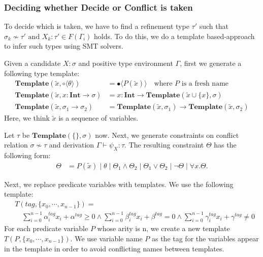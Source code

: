\documentclass[runningheads]{llncs}
\newcommand\COL{\mathbin{:}}
\newcommand \stypeint {\textbf{Int}}
\newcommand \stypebool {\bullet}
\newcommand \stypeboolf {\circ}
\newcommand \typeint[1]{{#1} : \stypeint}
\newcommand \typebool[1]{\stypebool \langle #1 \rangle}
\newcommand \typeboolf[1]{\stypeboolf \langle #1 \rangle}
\newcommand {\conflict}{\not \sim}
\begin{document}
\subsubsection{Deciding whether Decide or Conflict is taken}

To decide which is taken, we have to find a refinement type \( \tau' \) such that \( \sigma_k \conflict \tau' \text{ and } X_k \COL \tau' \in F(\Gamma_i) \) holds.
To do this, we do a template based-approach to infer such types using SMT solvers.


Given a candidate \( X \COL \sigma \) and positive type environment \( \Gamma \), first we generate a following type template:
\begin{align*}
    \textbf{Template}(\tilde{x}, \typeboolf{\theta})
        &= \typebool{P(\tilde{x})} \quad \text{where } P \text{ is a fresh name} \\
    \textbf{Template}(\tilde{x}, \typeint{x} \to \sigma)
        &= \typeint{x} \to \textbf{Template}(\tilde{x} \cup \{x\}, \sigma)\\
    \textbf{Template}(\tilde{x}, \sigma_1 \to \sigma_2)
        &= \textbf{Template}(\tilde{x}, \sigma_1)
        \to \textbf{Template}(\tilde{x}, \sigma_2)
\end{align*}
Here, we think \( \tilde{x} \) is a sequence of variables.

Let \( \tau \) be \( \textbf{Template}(\{\}, \sigma) \) now.
Next, we generate constraints on conflict relation \( \sigma \conflict \tau \)
and derivation \( \Gamma \vdash \psi_X \COL \tau \).
The resulting constraint \( \Theta \) has the following form:
\begin{align*}
    \Theta &= P(\tilde{x})
            \mid \theta
            \mid \Theta_1 \land \Theta_2
            \mid \Theta_1 \lor \Theta_2
            \mid \lnot \Theta
            \mid \forall x. \Theta.
\end{align*}

Next, we replace predicate variables with templates.
We use the following template:
\begin{align*}
    &T(tag, \{x_0, \cdots, x_{n-1}\}) = \\
       &\quad \sum_{i=0}^{n-1} \alpha^{tag}_i x_i + \alpha^{tag} \geq 0
        \land \sum_{i=0}^{n-1} \beta^{tag}_i x_i + \beta^{tag} = 0
        \land \sum_{i=0}^{n-1} \gamma^{tag}_i x_i + \gamma^{tag} \neq 0
\end{align*}
For each predicate variable \( P \) whose arity is n, we create a new template
\( T(P, \{x_0, \cdots, x_{n-1}\}) \). We use variable name \( P \) as the tag for the variables appear in the template in order to avoid conflicting names between templates.
\end{document}
